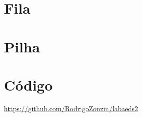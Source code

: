 \section{Fila}
\subsection{}




\subsection{}




\section{Pilha}
\subsection{}




\subsection{}






\section{Código}

\href{https://github.com/RodrigoZonzin/labaeds2}{https://github.com/RodrigoZonzin/labaeds2}